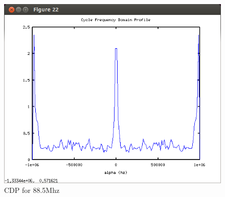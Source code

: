 \begin{figure}
\centering
\includegraphics[width=\linewidth]{../img/Report_CDP_885.png}
\caption{CDP for 88.5Mhz}
\label{fig:cdp885}

\end{figure}
